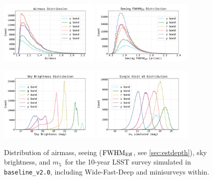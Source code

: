 \documentclass[PST,authoryear,toc]{lsstdoc}
\newcommand{\mf}{\ensuremath{m_5}}
\newcommand{\baseline}{\texttt{baseline\_v2.0}}
\newcommand{\fwhme}{\ensuremath{{\rm FWHM}_\mathrm{Eff}}}
\begin{document}
\begin{figure}
\centering
\includegraphics[width=0.43\textwidth]{figures/baseline_v2_0_10yrs_Count_airmass_u_g_r_i_z_y_ONED_ComboBinnedData.pdf}
\includegraphics[width=0.43\textwidth]{figures/baseline_v2_0_10yrs_Count_seeingFwhmEff_u_g_r_i_z_y_ONED_ComboBinnedData.pdf}

\includegraphics[width=0.43\textwidth]{figures/baseline_v2_0_10yrs_Count_skyBrightness_u_g_r_i_z_y_ONED_ComboBinnedData.pdf}
\includegraphics[width=0.43\textwidth]{figures/baseline_v2_0_10yrs_Count_fiveSigmaDepth_u_g_r_i_z_y_ONED_ComboBinnedData.pdf}
\caption{Distribution of airmass, seeing (\fwhme, see \autoref{sec:estdepth}), sky brightness, and \mf\ for the 10-year LSST survey simulated in \baseline, including Wide-Fast-Deep and minisurveys within.}\label{fig:bv2distributions}
\end{figure}
\FloatBarrier
\end{document}
